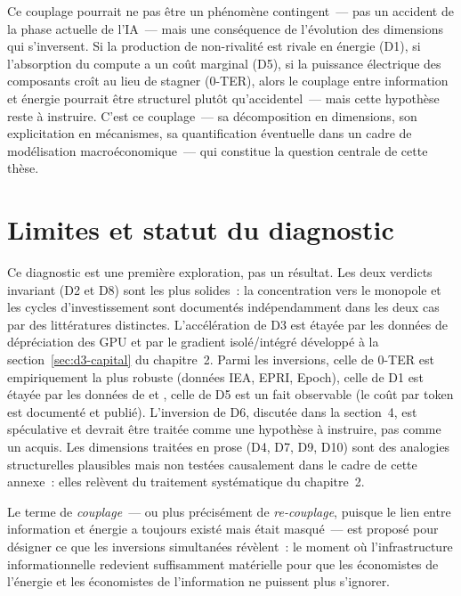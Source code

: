 Ce couplage pourrait ne pas être un phénomène contingent~--- pas un accident de la phase actuelle de l'IA~--- mais une conséquence de l'évolution des dimensions qui s'inversent. Si la production de non-rivalité est rivale en énergie (D1), si l'absorption du compute a un coût marginal (D5), si la puissance électrique des composants croît au lieu de stagner (0-TER), alors le couplage entre information et énergie pourrait être structurel plutôt qu'accidentel~--- mais cette hypothèse reste à instruire. C'est ce couplage~--- sa décomposition en dimensions, son explicitation en mécanismes, sa quantification éventuelle dans un cadre de modélisation macroéconomique~--- qui constitue la question centrale de cette thèse.

\section{Limites et statut du diagnostic}

Ce diagnostic est une première exploration, pas un résultat. Les deux verdicts \og invariant\fg{} (D2 et D8) sont les plus solides~: la concentration vers le monopole \parencite{gruber_semiconductor_1996} et les cycles d'investissement \parencite{perez_technological_2002} sont documentés indépendamment dans les deux cas par des littératures distinctes. L'accélération de D3 est étayée par les données de dépréciation des GPU et par le gradient isolé/intégré développé à la section~\ref{sec:d3-capital} du chapitre~2. Parmi les inversions, celle de 0-TER est empiriquement la plus robuste (données IEA, EPRI, Epoch), celle de D1 est étayée par les données de \textcite{cottier_rapid_2025} et \textcite{epoch_electricity_2025}, celle de D5 est un fait observable (le coût par token est documenté et publié). L'inversion de D6, discutée dans la section~4, est spéculative et devrait être traitée comme une hypothèse à instruire, pas comme un acquis. Les dimensions traitées en prose (D4, D7, D9, D10) sont des analogies structurelles plausibles mais non testées causalement dans le cadre de cette annexe~: elles relèvent du traitement systématique du chapitre~2.

Le terme de \emph{couplage}~--- ou plus précisément de \emph{re-couplage}, puisque le lien entre information et énergie a toujours existé mais était masqué~--- est proposé pour désigner ce que les inversions simultanées révèlent~: le moment où l'infrastructure informationnelle redevient suffisamment matérielle pour que les économistes de l'énergie et les économistes de l'information ne puissent plus s'ignorer.
